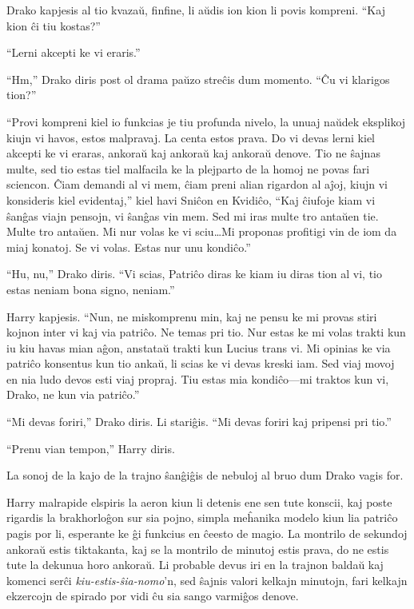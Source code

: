 Drako kapjesis al tio kvazaŭ, finfine, li aŭdis ion kion li povis
kompreni. ``Kaj kion ĉi tiu kostas?''

``Lerni akcepti ke vi eraris.''

``Hm,'' Drako diris post ol drama paŭzo streĉis dum momento. ``Ĉu vi
klarigos tion?''

``Provi kompreni kiel io funkcias je tiu profunda nivelo, la unuaj
naŭdek eksplikoj kiujn vi havos, estos malpravaj. La centa estos
prava. Do vi devas lerni kiel akcepti ke vi eraras, ankoraŭ kaj
ankoraŭ kaj ankoraŭ denove. Tio ne ŝajnas multe, sed tio estas tiel
malfacila ke la plejparto de la homoj ne povas fari sciencon. Ĉiam
demandi al vi mem, ĉiam preni alian rigardon al aĵoj, kiujn vi
konsideris kiel evidentaj,'' kiel havi Sniĉon en Kvidiĉo, ``Kaj
ĉiufoje kiam vi ŝanĝas viajn pensojn, vi ŝanĝas vin mem. Sed mi iras
multe tro antaŭen tie. Multe tro antaŭen. Mi nur volas ke vi
sciu\ldots Mi proponas profitigi vin de iom da miaj konatoj. Se vi
volas. Estas nur unu kondiĉo.''

``Hu, nu,'' Drako diris. ``Vi scias, Patriĉo diras ke kiam iu diras
tion al vi, tio estas neniam bona signo, neniam.''

Harry kapjesis. ``Nun, ne miskomprenu min, kaj ne pensu ke mi provas
stiri kojnon inter vi kaj via patriĉo. Ne temas pri tio. Nur estas ke
mi volas trakti kun iu kiu havas mian aĝon, anstataŭ trakti kun Lucius
trans vi. Mi opinias ke via patriĉo konsentus kun tio ankaŭ, li scias ke
vi devas kreski iam. Sed viaj movoj en nia ludo devos esti viaj
propraj. Tiu estas mia kondiĉo—mi traktos kun vi, Drako, ne kun via
patriĉo.''


``Mi devas foriri,'' Drako diris. Li stariĝis. ``Mi devas foriri kaj
pripensi pri tio.''

``Prenu vian tempon,'' Harry diris.

La sonoj de la kajo de la trajno ŝanĝiĝis de nebuloj al bruo dum Drako
vagis for.

Harry malrapide elspiris la aeron kiun li detenis ene sen tute
konscii, kaj poste rigardis la brakhorloĝon sur sia pojno, simpla
meĥanika modelo kiun lia patriĉo pagis por li, esperante ke ĝi
funkcius en ĉeesto de magio. La montrilo de sekundoj ankoraŭ estis
tiktakanta, kaj se la montrilo de minutoj estis prava, do ne estis
tute la dekunua horo ankoraŭ. Li probable devus iri en la trajnon
baldaŭ kaj komenci serĉi \emph{kiu-estis-ŝia-nomo}'n, sed ŝajnis
valori kelkajn minutojn, fari kelkajn ekzercojn de spirado por vidi ĉu
sia sango varmiĝos denove.


